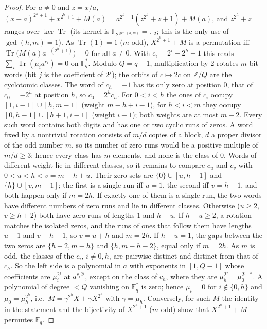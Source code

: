 \documentclass[preprint,12pt]{elsarticle}
\theoremstyle{definition}
\newcommand{\F}{\mathbb{F}}
\newcommand{\Z}{\mathbb{Z}}
\newcommand{\Tr}{\operatorname{Tr}}
\begin{document}
\begin{proof}
For $a\ne0$ and $z=x/a$, $(x+a)^{2^h+1}+x^{2^h+1}+M(a)=a^{2^h+1}(z^{2^h}+z+1)+M(a)$, and $z^{2^h}+z$ ranges over $\ker\Tr$ (its kernel is $\F_{2^{\gcd(h,m)}}=\F_2$; this is the only use of $\gcd(h,m)=1$). As $\Tr(1)=1$ ($m$ odd), $X^{2^h+1}+M$ is a permutation iff $\Tr\bigl(M(a)a^{-(2^h+1)}\bigr)=0$ for all $a\ne0$. With $c_i=2^i-2^h-1$ this reads $\sum_i\Tr(\mu_ia^{c_i})=0$ on $\F_q^*$. Modulo $Q=q-1$, multiplication by $2$ rotates $m$-bit words (bit $j$ is the coefficient of $2^j$); the orbits of $c\mapsto2c$ on $\Z/Q$ are the cyclotomic classes. The word of $c_h=-1$ has its only zero at position $0$, that of $c_0=-2^h$ at position $h$, so $c_0=2^hc_h$. For $0<i<h$ the ones of $c_i$ occupy $[1,i-1]\cup[h,m-1]$ (weight $m-h+i-1$), for $h<i<m$ they occupy $[0,h-1]\cup[h+1,i-1]$ (weight $i-1$); both weights are at most $m-2$. Every such word contains both digits and has one or two cyclic runs of zeros. A word fixed by a nontrivial rotation consists of $m/d$ copies of a block, $d$ a proper divisor of the odd number $m$, so its number of zero runs would be a positive multiple of $m/d\ge3$; hence every class has $m$ elements, and none is the class of $0$. Words of different weight lie in different classes, so it remains to compare $c_u$ and $c_v$ with $0<u<h<v=m-h+u$. Their zero sets are $\{0\}\cup[u,h-1]$ and $\{h\}\cup[v,m-1]$; the first is a single run iff $u=1$, the second iff $v=h+1$, and both happen only if $m=2h$. If exactly one of them is a single run, the two words have different numbers of zero runs and lie in different classes. Otherwise ($u\ge2$, $v\ge h+2$) both have zero runs of lengths $1$ and $h-u$. If $h-u\ge2$, a rotation matches the isolated zeros, and the runs of ones that follow them have lengths $u-1$ and $v-h-1$, so $v=u+h$ and $m=2h$. If $h-u=1$, the gaps between the two zeros are $\{h-2,m-h\}$ and $\{h,m-h-2\}$, equal only if $m=2h$. As $m$ is odd, the classes of the $c_i$, $i\ne0,h$, are pairwise distinct and distinct from that of $c_h$. So the left side is a polynomial in $a$ with exponents in $[1,Q-1]$ whose coefficients are $\mu_i^{2^j}$ at $a^{c_i2^j}$, except on the class of $c_h$, where they are $\mu_h^{2^j}+\mu_0^{2^{j-h}}$. A polynomial of degree $<Q$ vanishing on $\F_q^*$ is zero; hence $\mu_i=0$ for $i\notin\{0,h\}$ and $\mu_0=\mu_h^{2^h}$, i.e.\ $M=\gamma^{2^h}X+\gamma X^{2^h}$ with $\gamma=\mu_h$. Conversely, for such $M$ the identity in the statement and the bijectivity of $X^{2^h+1}$ ($m$ odd) show that $X^{2^h+1}+M$ permutes $\F_q$.
\end{proof}
\end{document}
